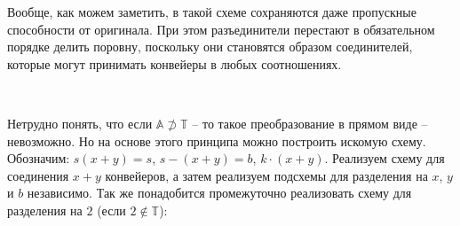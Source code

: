 \vspace{0.4in}

Вообще, как можем заметить, в такой схеме сохраняются даже пропускные способности от оригинала. При этом разъединители перестают в обязательном порядке делить поровну, поскольку они становятся образом соединителей, которые могут принимать конвейеры в любых соотношениях.

\

Нетрудно понять, что если $\mathbb{A} \not\supset \mathbb{T}$ -- то такое преобразование в прямом виде -- невозможно. Но на основе этого принципа можно построить искомую схему. Обозначим: $s(x+y) = s$, $s - (x+y) = b$, $k\cdot(x+y)$. Реализуем схему для соединения $x+y$ конвейеров, а затем реализуем подсхемы для разделения на $x$, $y$ и $b$ независимо. Так же понадобится промежуточно реализовать схему для разделения на $2$ (если $2 \not\in \mathbb{T}$):






\newpage

